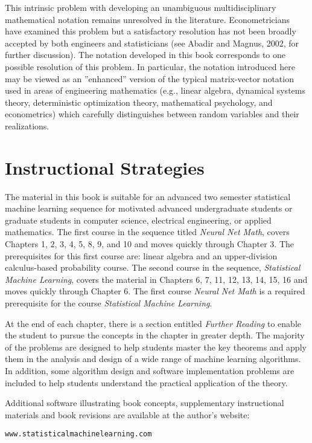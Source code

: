 This intrinsic problem with developing an unambiguous multidisciplinary
mathematical notation remains unresolved in the literature. Econometricians have examined 
this problem but a satisfactory resolution has not been
broadly accepted by both engineers and statisticians (see Abadir and Magnus, 2002, for
further discussion). The notation developed in this book corresponds to one possible resolution
of this problem. In particular, the notation introduced here
may be viewed as an ''enhanced'' version of the typical matrix-vector notation used in areas of engineering mathematics
(e.g., linear algebra, dynamical systems theory, deterministic optimization theory,
mathematical psychology, and econometrics) which carefully distinguishes between random variables
and their realizations.
\nocite{AbMa2002}

\section*{Instructional Strategies}
The material in this book is suitable for an advanced two semester statistical machine learning sequence for 
motivated advanced undergraduate students or graduate students in computer science, electrical engineering,
or applied mathematics. 
The first course in the sequence titled {\em Neural Net Math}, covers Chapters 1, 2, 3, 4, 5, 8, 9, and 10
and moves quickly through Chapter 3.
The prerequisites for this first course are: linear algebra and an
upper-division calculus-based probability course.
The second course in the sequence, {\em Statistical Machine Learning},  covers the 
material in Chapters 6, 7, 11, 12, 13, 14, 15, 16 and moves quickly through Chapter 6.
The first course {\em Neural Net Math} is a required prerequisite for the course 
{\em Statistical Machine Learning}. 

At the end of each chapter, there is a section entitled {\em Further Reading}
to enable the student to pursue the concepts in the chapter in greater depth.
The majority of the problems are designed to help students master the key theorems
and apply them in the analysis and design of a wide range of machine learning algorithms.
In addition, some algorithm design and software implementation
problems are included to help students understand
the practical application of the theory. 

Additional software illustrating book concepts, supplementary instructional materials and book revisions are available
at the author's website: 
\begin{verbatim}
www.statisticalmachinelearning.com
\end{verbatim}


